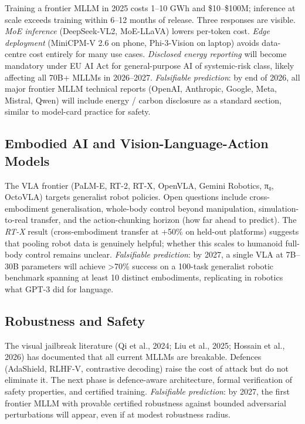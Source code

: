 Training a frontier MLLM in 2025 costs 1--10 GWh and \$10--\$100M; inference at scale exceeds training within 6--12 months of release. Three responses are visible. \emph{MoE inference} (DeepSeek-VL2, MoE-LLaVA) lowers per-token cost. \emph{Edge deployment} (MiniCPM-V 2.6 on phone, Phi-3-Vision on laptop) avoids data-centre cost entirely for many use cases. \emph{Disclosed energy reporting} will become mandatory under EU AI Act for general-purpose AI of systemic-risk class, likely affecting all 70B+ MLLMs in 2026--2027. \emph{Falsifiable prediction}: by end of 2026, all major frontier MLLM technical reports (OpenAI, Anthropic, Google, Meta, Mistral, Qwen) will include energy / carbon disclosure as a standard section, similar to model-card practice for safety.

\subsection{Embodied AI and Vision-Language-Action Models}\label{embodied-ai-and-vision-language-action-models}

The VLA frontier (PaLM-E, RT-2, RT-X, OpenVLA, Gemini Robotics, π₀, OctoVLA) targets generalist robot policies. Open questions include cross-embodiment generalisation, whole-body control beyond manipulation, simulation-to-real transfer, and the action-chunking horizon (how far ahead to predict). The \emph{RT-X} result (cross-embodiment transfer at +50\% on held-out platforms) suggests that pooling robot data is genuinely helpful; whether this scales to humanoid full-body control remains unclear. \emph{Falsifiable prediction}: by 2027, a single VLA at 7B--30B parameters will achieve \textgreater70\% success on a 100-task generalist robotic benchmark spanning at least 10 distinct embodiments, replicating in robotics what GPT-3 did for language.

\subsection{Robustness and Safety}\label{robustness-and-safety}

The visual jailbreak literature (Qi et al., 2024; Liu et al., 2025; Hossain et al., 2026) has documented that all current MLLMs are breakable. Defences (AdaShield, RLHF-V, contrastive decoding) raise the cost of attack but do not eliminate it. The next phase is defence-aware architecture, formal verification of safety properties, and certified training. \emph{Falsifiable prediction}: by 2027, the first frontier MLLM with provable certified robustness against bounded adversarial perturbations will appear, even if at modest robustness radius.


